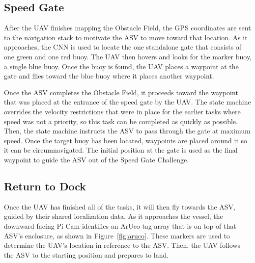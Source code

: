 \documentclass[letterpaper, 12 pt, conference]{ieeeconf}
\begin{document}
\subsection{Speed Gate}
\label{SpeedGate}
% 
After the UAV finishes mapping the Obstacle Field, the GPS coordinates are sent to the navigation stack to motivate the ASV to move toward that location. As it approaches, the CNN is used to locate the one standalone gate that consists of one green and one red buoy. The UAV then hovers and looks for the marker buoy, a single blue buoy. Once the buoy is found, the UAV places a waypoint at the gate and flies toward the blue buoy where it places another waypoint. 

Once the ASV completes the Obstacle Field, it proceeds toward the waypoint that was placed at the entrance of the speed gate by the UAV. The state machine overrides the velocity restrictions that were in place for the earlier tasks where speed was not a priority, so this task can be completed as quickly as possible. Then, the state machine instructs the ASV to pass through the gate at maximum speed. Once the target buoy has been located, waypoints are placed around it so it can be circumnavigated. The initial position at the gate is used as the final waypoint to guide the ASV out of the Speed Gate Challenge. 
% 
\subsection{Return to Dock}
\label{ReturnToDock}
% 
Once the UAV has finished all of the tasks, it will then fly towards the ASV, guided by their shared localization data. As it approaches the vessel, the downward facing Pi Cam identifies an ArUco tag array that is on top of that ASV's enclosure, as shown in Figure~\ref{fig:aruco}. These markers are used to determine the UAV's location in reference to the ASV. Then, the UAV follows the ASV to the starting position and prepares to land.
\end{document}
